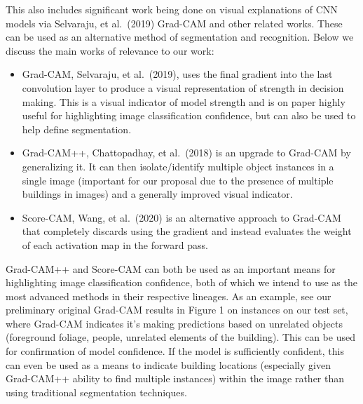 \documentclass{article}
\begin{document}
This also includes significant work being done on visual explanations of CNN models via Selvaraju, et al.\ (2019) Grad-CAM and other related works. These can be used as an alternative method of segmentation and recognition. Below we discuss the main works of relevance to our work:


\begin{itemize} %
    \item Grad-CAM, Selvaraju, et al.\ (2019), uses the final gradient into the last convolution layer to produce a visual representation of strength in decision making. This is a visual indicator of model strength and is on paper highly useful for highlighting image classification confidence, but can also be used to help define segmentation. 
    \item Grad-CAM++, Chattopadhay, et al.\ (2018) is an upgrade to Grad-CAM by generalizing it. It can then isolate/identify multiple object instances in a single image (important for our proposal due to the presence of multiple buildings in images) and a generally improved visual indicator. 
    \item Score-CAM, Wang, et al.\ (2020) is an alternative approach to Grad-CAM that completely discards using the gradient and instead evaluates the weight of each activation map in the forward pass. 
\end{itemize}

Grad-CAM++ and Score-CAM can both be used as an important means for highlighting image classification confidence, both of which we intend to use as the most advanced methods in their respective lineages. As an example, see our preliminary original Grad-CAM results in Figure 1 on instances on our test set, where Grad-CAM indicates it's making predictions based on unrelated objects (foreground foliage, people, unrelated elements of the building). This can be used for confirmation of model confidence. If the model is sufficiently confident, this can even be used as a means to indicate building locations (especially given Grad-CAM++ ability to find multiple instances) within the image rather than using traditional segmentation techniques.
\end{document}
